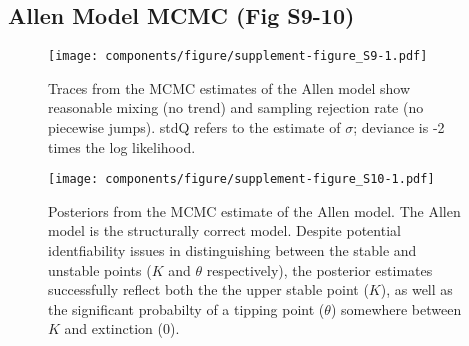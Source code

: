 \documentclass[]{components/elsarticle}
\begin{document}
\newpage 
\newpage 

\subsection{Allen Model MCMC (Fig
S9-10)}\label{allen-model-mcmc-fig-s9-10}

\begin{figure}[htbp]
\centering
\texttt{[image: components/figure/supplement-figure\_S9-1.pdf]}
\caption{Traces from the MCMC estimates of the Allen model show
reasonable mixing (no trend) and sampling rejection rate (no piecewise
jumps). stdQ refers to the estimate of $\sigma$; deviance is -2 times
the log likelihood.}
\end{figure}

\begin{figure}[htbp]
\centering
\texttt{[image: components/figure/supplement-figure\_S10-1.pdf]}
\caption{Posteriors from the MCMC estimate of the Allen model. The Allen
model is the structurally correct model. Despite potential
identfiability issues in distinguishing between the stable and unstable
points ($K$ and $\theta$ respectively), the posterior estimates
successfully reflect both the the upper stable point ($K$), as well as
the significant probabilty of a tipping point ($\theta$) somewhere
between $K$ and extinction (0).}
\end{figure}
\end{document}
